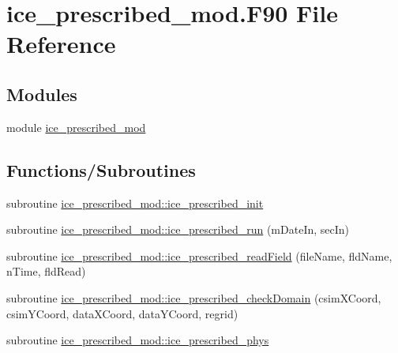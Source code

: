 \hypertarget{ice__prescribed__mod_8F90}{
\section{ice\_\-prescribed\_\-mod.F90 File Reference}
\label{ice__prescribed__mod_8F90}
}
\subsection*{Modules}
\begin{DoxyCompactItemize}
\item 
module \hyperlink{namespaceice__prescribed__mod}{ice\_\-prescribed\_\-mod}
\end{DoxyCompactItemize}
\subsection*{Functions/Subroutines}
\begin{DoxyCompactItemize}
\item 
subroutine \hyperlink{namespaceice__prescribed__mod_a653502aece9eed08846385d30fec703b}{ice\_\-prescribed\_\-mod::ice\_\-prescribed\_\-init}
\item 
subroutine \hyperlink{namespaceice__prescribed__mod_a73bcaa2e547c18a24eeabaa2e22e8fe9}{ice\_\-prescribed\_\-mod::ice\_\-prescribed\_\-run} (mDateIn, secIn)
\item 
subroutine \hyperlink{namespaceice__prescribed__mod_aa67a3710c35bda9e15dedf703582f149}{ice\_\-prescribed\_\-mod::ice\_\-prescribed\_\-readField} (fileName, fldName, nTime, fldRead)
\item 
subroutine \hyperlink{namespaceice__prescribed__mod_acc7d1e7dfe5627bee722781e039280c9}{ice\_\-prescribed\_\-mod::ice\_\-prescribed\_\-checkDomain} (csimXCoord, csimYCoord, dataXCoord, dataYCoord, regrid)
\item 
subroutine \hyperlink{namespaceice__prescribed__mod_a9e6ac38b742040541c97492d74282b7a}{ice\_\-prescribed\_\-mod::ice\_\-prescribed\_\-phys}
\end{DoxyCompactItemize}
